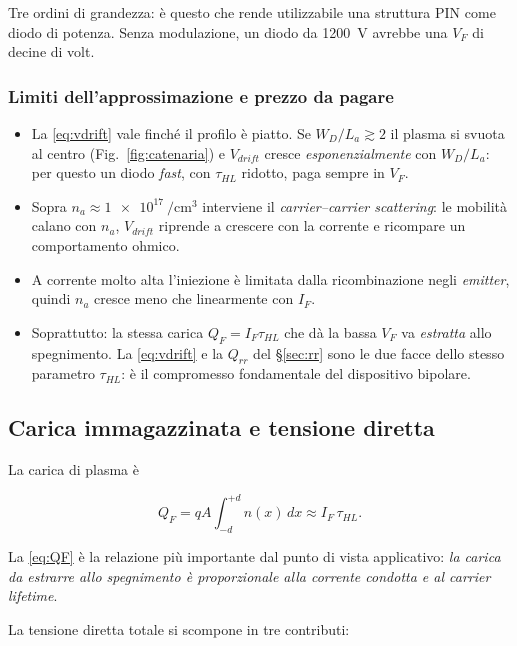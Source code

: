 \documentclass[11pt,a4paper]{article}
\begin{document}
Tre ordini di grandezza: è questo che rende utilizzabile una struttura PIN come
diodo di potenza. Senza modulazione, un diodo da \SI{1200}{\volt} avrebbe una
$V_F$ di decine di volt.

\subsubsection*{Limiti dell'approssimazione e prezzo da pagare}

\begin{itemize}
\item La \eqref{eq:vdrift} vale finché il profilo è piatto. Se
$W_D / L_a \gtrsim 2$ il plasma si svuota al centro (Fig.~\ref{fig:catenaria}) e $V_{drift}$
cresce \emph{esponenzialmente} con $W_D/L_a$: per questo un diodo \emph{fast},
con $\tau_{HL}$ ridotto, paga sempre in $V_F$.
\item Sopra $n_a \approx \SI{1e17}{\per\centi\meter\cubed}$ interviene il
\emph{carrier--carrier scattering}: le mobilità calano con $n_a$, $V_{drift}$
riprende a crescere con la corrente e ricompare un comportamento ohmico.
\item A corrente molto alta l'iniezione è limitata dalla ricombinazione negli
\emph{emitter}, quindi $n_a$ cresce meno che linearmente con $I_F$.
\item Soprattutto: la stessa carica $Q_F = I_F \tau_{HL}$ che dà la bassa $V_F$
va \emph{estratta} allo spegnimento. La \eqref{eq:vdrift} e la
$Q_{rr}$ del \S\ref{sec:rr} sono le due facce dello stesso parametro
$\tau_{HL}$: è il compromesso fondamentale del dispositivo bipolare.
\end{itemize}

\subsection{Carica immagazzinata e tensione diretta}

La carica di plasma è

\begin{equation}
Q_F = q A \int_{-d}^{+d} n(x)\,dx \approx I_F \, \tau_{HL} .
\label{eq:QF}
\end{equation}

La \eqref{eq:QF} è la relazione più importante dal punto di vista applicativo:
\emph{la carica da estrarre allo spegnimento è proporzionale alla corrente
condotta e al carrier lifetime}.

La tensione diretta totale si scompone in tre contributi:
\end{document}
